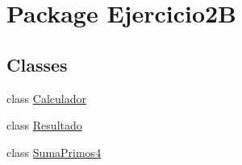 \hypertarget{namespace_ejercicio2_b}{}\section{Package Ejercicio2B}
\label{namespace_ejercicio2_b}
\subsection*{Classes}
\begin{DoxyCompactItemize}
\item 
class \mbox{\hyperlink{class_ejercicio2_b_1_1_calculador}{Calculador}}
\item 
class \mbox{\hyperlink{class_ejercicio2_b_1_1_resultado}{Resultado}}
\item 
class \mbox{\hyperlink{class_ejercicio2_b_1_1_suma_primos4}{Suma\+Primos4}}
\end{DoxyCompactItemize}
